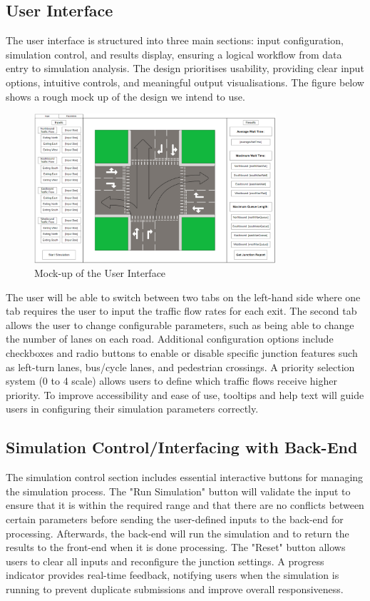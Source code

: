 \documentclass{article}
\begin{document}
\subsection{User Interface}
The user interface is structured into three main sections: input configuration, simulation
control, and results display, ensuring a logical workflow from data entry to simulation
analysis. The design prioritises usability, providing clear input options, intuitive controls, and
meaningful output visualisations. The figure below shows a rough mock up of the design we intend to use.


\begin{figure}[H]
    \centering
    \includegraphics[width=0.8\textwidth]{frontendUI.png}
    \caption{Mock-up of the User Interface}
    \label{frontendUI}
\end{figure}

The user will be able to switch between two tabs on the left-hand side where one tab requires the user to input the traffic flow rates for each exit. The second tab allows the user to change configurable parameters, such as being able to change the number of lanes on each road. Additional
configuration options include checkboxes and radio buttons to enable or disable specific junction features such as left-turn lanes, bus/cycle lanes, and pedestrian crossings. A priority selection system (0 to 4 scale) allows users to define which traffic flows receive higher priority. To improve accessibility and ease of use, tooltips and help text will guide users in configuring their simulation parameters correctly.

\subsection{Simulation Control/Interfacing with Back-End}
The simulation control section includes essential interactive buttons for managing the
simulation process. The "Run Simulation" button will validate the input to ensure that it is within the required range and that there are no conflicts between certain parameters before sending the user-defined inputs to the back-end
for processing. Afterwards, the back-end will run the simulation and to return the results to the front-end when it is done processing. 
The "Reset" button allows users to clear all inputs and reconfigure the
junction settings. A progress indicator provides real-time feedback, notifying users when the
simulation is running to prevent duplicate submissions and improve overall responsiveness.
\end{document}
